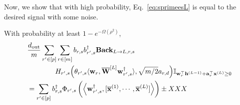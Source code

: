 		
		
		
		
		
		
		\iffalse
		Now, we show that with high probability, Eq.~\ref{eq:sprimeesL} is equal to the desired signal with some noise.
		\begin{claim}
			With probability at least $1 - e^{-\Omega(\rho^2)}$,
			\begin{align*}
				&\frac{d_{\mathrm{out}} }{m}    \sum_{r' \in [p]} \sum_{r \in [m]}  b_{r, s} b_{r', s}^{\dagger} \mathbf{Back}_{L \to L, r, s} \\& \quad \quad \quad \quad H_{r', s}\Big(\theta_{r', s} \langle \mathbf{w}_{r}, \overline{\mathbf{W}}^{[L]} \mathbf{w}_{r', s}^{\dagger}\rangle, \sqrt{m/2} a_{r, d}\Big) \mathbb{I}_{\mathbf{w}_r^{\top} \mathbf{h}^{(L-1)} + \mathbf{a}_r^{\top} \mathbf{x}^{(L)} \ge 0}
				\\&= \sum_{r' \in[p]} b_{r, s}^{\dagger} \Phi_{r', s} \left(\left\langle \mathbf{w}_{r', s}^{\dagger}, [\overline{\mathbf{x}}^{(1)}, \cdots, \overline{\mathbf{x}}^{(L)}]\right\rangle\right) \pm XXX
			\end{align*}
			

\end{claim}
